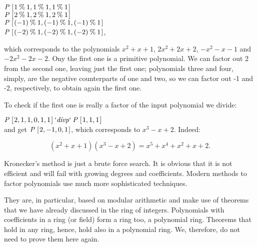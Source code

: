 \documentclass[tikz]{scrreprt}
\newcommand{\Conid}[1]{\mathit{#1}}
\newcommand{\Varid}[1]{\mathit{#1}}
\begin{document}
\begin{minipage}{\textwidth}
\ensuremath{\Conid{P}\;[\mskip1.5mu \mathrm{1}\mathbin{\%}\mathrm{1},\mathrm{1}\mathbin{\%}\mathrm{1},\mathrm{1}\mathbin{\%}\mathrm{1}\mskip1.5mu]}\\
\ensuremath{\Conid{P}\;[\mskip1.5mu \mathrm{2}\mathbin{\%}\mathrm{1},\mathrm{2}\mathbin{\%}\mathrm{1},\mathrm{2}\mathbin{\%}\mathrm{1}\mskip1.5mu]}\\
\ensuremath{\Conid{P}\;[\mskip1.5mu (\mathbin{-}\mathrm{1})\mathbin{\%}\mathrm{1},(\mathbin{-}\mathrm{1})\mathbin{\%}\mathrm{1},(\mathbin{-}\mathrm{1})\mathbin{\%}\mathrm{1}\mskip1.5mu]}\\
\ensuremath{\Conid{P}\;[\mskip1.5mu (\mathbin{-}\mathrm{2})\mathbin{\%}\mathrm{1},(\mathbin{-}\mathrm{2})\mathbin{\%}\mathrm{1},(\mathbin{-}\mathrm{2})\mathbin{\%}\mathrm{1}\mskip1.5mu]},
\end{minipage}

which corresponds to the polynomials
$x^2+x+1$, $2x^2+2x+2$,
$-x^2-x -1$ and $-2x^2-2x-2$.
Ony the first one is a primitive polynomial.
We can factor out 2 from the second one,
leaving just the first one;
polynomials three and four, simply, are 
the negative counterparts of one and two,
so we can factor out -1 and -2, respectively,
to obtain again the first one.

To check if the first one is really a factor
of the input polynomial we divide:

\ensuremath{\Conid{P}\;[\mskip1.5mu \mathrm{2},\mathrm{1},\mathrm{1},\mathrm{0},\mathrm{1},\mathrm{1}\mskip1.5mu]\mathbin{`\Varid{divp}`}\Conid{P}\;[\mskip1.5mu \mathrm{1},\mathrm{1},\mathrm{1}\mskip1.5mu]}\\
 and get
\ensuremath{\Conid{P}\;[\mskip1.5mu \mathrm{2},\mathbin{-}\mathrm{1},\mathrm{0},\mathrm{1}\mskip1.5mu]}, which corresponds to 
$x^3 - x + 2$. Indeed:

\begin{equation}
(x^2 + x + 1)(x^3 - x + 2) = x^5 + x^4 + x^2 + x + 2.
\end{equation}

Kronecker's method is just a brute force search.
It is obvious that it is not efficient and will fail
with growing degrees and coefficients.
Modern methods to factor polynomials use
much more sophisticated techniques.

They are, in particular, based on modular arithmetic
and make use of theorems that we have
already discussed in the ring of integers.
Polynomials with coefficients in a ring (or field)
form a ring too, a polynomial ring.
Theorems that hold in any ring, hence, hold also
in a polynomial ring. We, therefore, do not need
to prove them here again.
\end{document}

